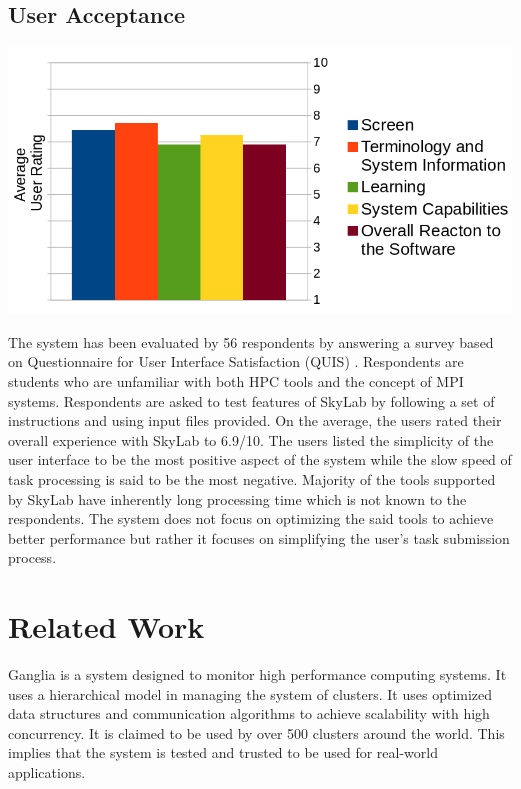 	\subsection{User Acceptance}
	\begin{center}			
			\includegraphics[scale=0.32]{./images/uat_graph.png}			
	\end{center}
	The system has been evaluated by 56 respondents by answering a survey based on Questionnaire for User Interface Satisfaction (QUIS) \cite{chin1988development}. Respondents are students who are unfamiliar with both HPC tools and the concept of MPI systems.  Respondents are asked to test features of SkyLab by following a set of instructions and using input files provided. On the average, the users rated their overall experience with SkyLab to 6.9/10. The users listed the simplicity of the user interface to be the most positive aspect of the system while the slow speed of task processing is said to be the most negative. Majority of the tools supported by SkyLab have inherently long processing time which is not known to the respondents. The system does not focus on optimizing the said tools to achieve better performance but rather it focuses on simplifying the user's task submission process. 

\section{Related Work}
Ganglia is a system designed to monitor high performance computing systems. It uses a hierarchical model in managing the system of clusters. It uses optimized data structures and communication algorithms to achieve scalability with high concurrency. It is claimed to be used by over 500 clusters around the world. This implies that the system is tested and trusted to be used for real-world applications\cite{1395654820040701}.
	    
